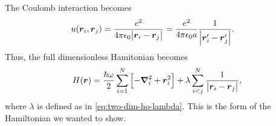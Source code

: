         The Coulomb interaction becomes
        \begin{align}
            u(\boldsymbol{r}_i, \boldsymbol{r}_j)
            &= \frac{e^2}{4\pi\epsilon_0 \abs{\boldsymbol{r}_i - \boldsymbol{r}_j}}
            = \frac{e^2}{4\pi \epsilon_0 a}
            \frac{1}{\abs{\boldsymbol{r}_i' - \boldsymbol{r}_j'}}.
        \end{align}
        Thus, the full dimensionless Hamitonian becomes
        \begin{align}
            H(\boldsymbol{r})
            = \frac{\hslash\omega}{2} \sum_{i = 1}^{N}\left[ 
                -\boldsymbol{\nabla}^2_i
                + \boldsymbol{r}^2_i
             \right]
            + \lambda \sum_{i < j}^{N} \frac{1}{\abs{\boldsymbol{r}_i - \boldsymbol{r}_j}},
        \end{align}
        where $\lambda$ is defined as in \autoref{eq:two-dim-ho-lambda}.
        This is the form of the Hamiltonian we wanted to show.

